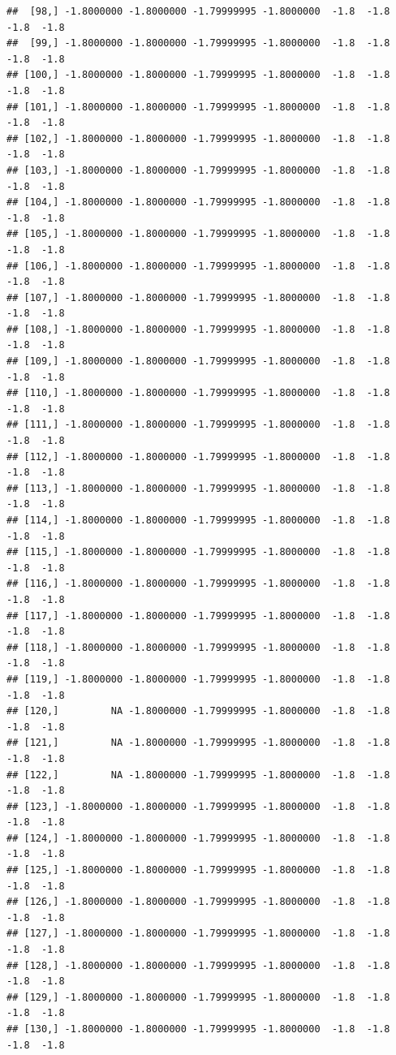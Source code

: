 \documentclass{article}\usepackage[]{graphicx}\usepackage[]{color}
\makeatletter
\newenvironment{kframe}{%
 \def\at@end@of@kframe{}%
 \ifinner\ifhmode%
  \def\at@end@of@kframe{\end{minipage}}%
  \begin{minipage}{\columnwidth}%
 \fi\fi%
 \def\FrameCommand##1{\hskip\@totalleftmargin \hskip-\fboxsep
 \colorbox{shadecolor}{##1}\hskip-\fboxsep
     \hskip-\linewidth \hskip-\@totalleftmargin \hskip\columnwidth}%
 \MakeFramed {\advance\hsize-\width
   \@totalleftmargin\z@ \linewidth\hsize
   \@setminipage}}%
 {\par\unskip\endMakeFramed%
 \at@end@of@kframe}
\newenvironment{knitrout}{}{} %
\makeatother
\begin{document}
\begin{knitrout}
\begin{kframe}
\begin{verbatim}
##  [98,] -1.8000000 -1.8000000 -1.79999995 -1.8000000  -1.8  -1.8  -1.8  -1.8
##  [99,] -1.8000000 -1.8000000 -1.79999995 -1.8000000  -1.8  -1.8  -1.8  -1.8
## [100,] -1.8000000 -1.8000000 -1.79999995 -1.8000000  -1.8  -1.8  -1.8  -1.8
## [101,] -1.8000000 -1.8000000 -1.79999995 -1.8000000  -1.8  -1.8  -1.8  -1.8
## [102,] -1.8000000 -1.8000000 -1.79999995 -1.8000000  -1.8  -1.8  -1.8  -1.8
## [103,] -1.8000000 -1.8000000 -1.79999995 -1.8000000  -1.8  -1.8  -1.8  -1.8
## [104,] -1.8000000 -1.8000000 -1.79999995 -1.8000000  -1.8  -1.8  -1.8  -1.8
## [105,] -1.8000000 -1.8000000 -1.79999995 -1.8000000  -1.8  -1.8  -1.8  -1.8
## [106,] -1.8000000 -1.8000000 -1.79999995 -1.8000000  -1.8  -1.8  -1.8  -1.8
## [107,] -1.8000000 -1.8000000 -1.79999995 -1.8000000  -1.8  -1.8  -1.8  -1.8
## [108,] -1.8000000 -1.8000000 -1.79999995 -1.8000000  -1.8  -1.8  -1.8  -1.8
## [109,] -1.8000000 -1.8000000 -1.79999995 -1.8000000  -1.8  -1.8  -1.8  -1.8
## [110,] -1.8000000 -1.8000000 -1.79999995 -1.8000000  -1.8  -1.8  -1.8  -1.8
## [111,] -1.8000000 -1.8000000 -1.79999995 -1.8000000  -1.8  -1.8  -1.8  -1.8
## [112,] -1.8000000 -1.8000000 -1.79999995 -1.8000000  -1.8  -1.8  -1.8  -1.8
## [113,] -1.8000000 -1.8000000 -1.79999995 -1.8000000  -1.8  -1.8  -1.8  -1.8
## [114,] -1.8000000 -1.8000000 -1.79999995 -1.8000000  -1.8  -1.8  -1.8  -1.8
## [115,] -1.8000000 -1.8000000 -1.79999995 -1.8000000  -1.8  -1.8  -1.8  -1.8
## [116,] -1.8000000 -1.8000000 -1.79999995 -1.8000000  -1.8  -1.8  -1.8  -1.8
## [117,] -1.8000000 -1.8000000 -1.79999995 -1.8000000  -1.8  -1.8  -1.8  -1.8
## [118,] -1.8000000 -1.8000000 -1.79999995 -1.8000000  -1.8  -1.8  -1.8  -1.8
## [119,] -1.8000000 -1.8000000 -1.79999995 -1.8000000  -1.8  -1.8  -1.8  -1.8
## [120,]         NA -1.8000000 -1.79999995 -1.8000000  -1.8  -1.8  -1.8  -1.8
## [121,]         NA -1.8000000 -1.79999995 -1.8000000  -1.8  -1.8  -1.8  -1.8
## [122,]         NA -1.8000000 -1.79999995 -1.8000000  -1.8  -1.8  -1.8  -1.8
## [123,] -1.8000000 -1.8000000 -1.79999995 -1.8000000  -1.8  -1.8  -1.8  -1.8
## [124,] -1.8000000 -1.8000000 -1.79999995 -1.8000000  -1.8  -1.8  -1.8  -1.8
## [125,] -1.8000000 -1.8000000 -1.79999995 -1.8000000  -1.8  -1.8  -1.8  -1.8
## [126,] -1.8000000 -1.8000000 -1.79999995 -1.8000000  -1.8  -1.8  -1.8  -1.8
## [127,] -1.8000000 -1.8000000 -1.79999995 -1.8000000  -1.8  -1.8  -1.8  -1.8
## [128,] -1.8000000 -1.8000000 -1.79999995 -1.8000000  -1.8  -1.8  -1.8  -1.8
## [129,] -1.8000000 -1.8000000 -1.79999995 -1.8000000  -1.8  -1.8  -1.8  -1.8
## [130,] -1.8000000 -1.8000000 -1.79999995 -1.8000000  -1.8  -1.8  -1.8  -1.8

\end{verbatim}
\end{kframe}
\end{knitrout}
\end{document}
